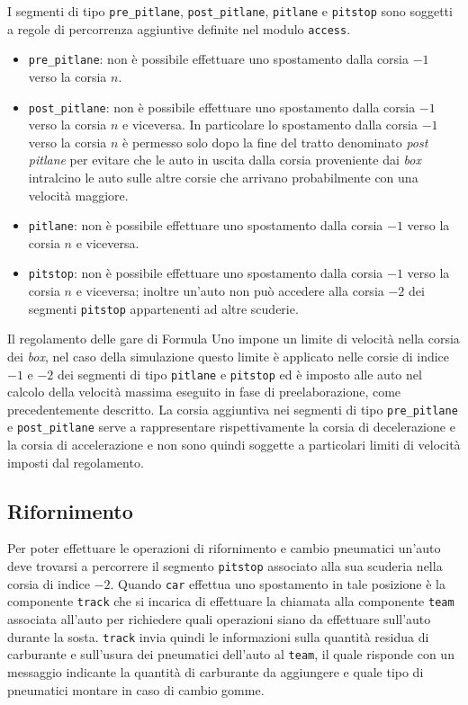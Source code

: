 \documentclass[a4paper]{report}
\begin{document}
I segmenti di tipo \texttt{pre\_pitlane}, \texttt{post\_pitlane}, \texttt{pitlane} e \texttt{pitstop} sono soggetti a regole di percorrenza aggiuntive definite nel modulo \texttt{access}.
\begin{itemize}
\item \texttt{pre\_pitlane}: non è possibile effettuare uno spostamento dalla corsia $-1$ verso la corsia $n$.
\item \texttt{post\_pitlane}: non è possibile effettuare uno spostamento dalla corsia $-1$ verso la corsia $n$ e viceversa. In particolare lo spostamento dalla corsia $-1$ verso la corsia $n$ è permesso solo dopo la fine del tratto denominato \textit{post pitlane} per evitare che le auto in uscita dalla corsia proveniente dai \textit{box} intralcino le auto sulle altre corsie che arrivano probabilmente con una velocità maggiore.
\item \texttt{pitlane}: non è possibile effettuare uno spostamento dalla corsia $-1$ verso la corsia $n$ e viceversa.
\item \texttt{pitstop}: non è possibile effettuare uno spostamento dalla corsia $-1$ verso la corsia $n$ e viceversa; inoltre un'auto non può accedere alla corsia $-2$ dei segmenti \texttt{pitstop} appartenenti ad altre scuderie.
\end{itemize}

Il regolamento delle gare di Formula Uno impone un limite di velocità nella corsia dei \textit{box}, nel caso della simulazione questo limite è applicato nelle corsie di indice $-1$ e $-2$ dei segmenti di tipo \texttt{pitlane} e \texttt{pitstop} ed è imposto alle auto nel calcolo della velocità massima eseguito in fase di preelaborazione, come precedentemente descritto.
La corsia aggiuntiva nei segmenti di tipo \texttt{pre\_pitlane} e \texttt{post\_pitlane} serve a rappresentare rispettivamente la corsia di decelerazione e la corsia di accelerazione e non sono quindi soggette a particolari limiti di velocità imposti dal regolamento.

\subsection{Rifornimento}
\label{sec:rifornimento}
Per poter effettuare le operazioni di rifornimento e cambio pneumatici un'auto deve trovarsi a percorrere il segmento \texttt{pitstop} associato alla sua scuderia nella corsia di indice $-2$. Quando \texttt{car} effettua uno spostamento in tale posizione è la componente \texttt{track} che si incarica di effettuare la chiamata alla componente \texttt{team} associata all'auto per richiedere quali operazioni siano da effettuare sull'auto durante la sosta. \texttt{track} invia quindi le informazioni sulla quantità residua di carburante e sull'usura dei pneumatici dell'auto al \texttt{team}, il quale risponde con un messaggio indicante la quantità di carburante da aggiungere e quale tipo di pneumatici montare in caso di cambio gomme.
\end{document}
